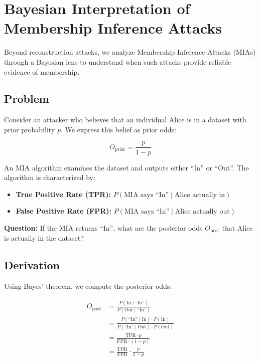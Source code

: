 \documentclass[11pt,letterpaper]{article}
\begin{document}
\section{Bayesian Interpretation of Membership Inference Attacks}

Beyond reconstruction attacks, we analyze Membership Inference Attacks (MIAs) through a Bayesian lens to understand when such attacks provide reliable evidence of membership.

\subsection{Problem}

Consider an attacker who believes that an individual Alice is in a dataset with prior probability $p$. We express this belief as prior odds:

\begin{equation}
    O_{\text{prior}} = \frac{p}{1-p}
\end{equation}

An MIA algorithm examines the dataset and outputs either ``In'' or ``Out''. The algorithm is characterized by:

\begin{itemize}[leftmargin=*]
    \item \textbf{True Positive Rate (TPR):} $P(\text{MIA says ``In''} \mid \text{Alice actually in})$
    \item \textbf{False Positive Rate (FPR):} $P(\text{MIA says ``In''} \mid \text{Alice actually out})$
\end{itemize}

\textbf{Question:} If the MIA returns ``In'', what are the posterior odds $O_{\text{post}}$ that Alice is actually in the dataset?

\subsection{Derivation}

Using Bayes' theorem, we compute the posterior odds:

\begin{align}
    O_{\text{post}} &= \frac{P(\text{In} \mid \text{``In''})}{P(\text{Out} \mid \text{``In''})} \\
    &= \frac{P(\text{``In''} \mid \text{In}) \cdot P(\text{In})}{P(\text{``In''} \mid \text{Out}) \cdot P(\text{Out})} \\
    &= \frac{\text{TPR} \cdot p}{\text{FPR} \cdot (1-p)} \\
    &= \frac{\text{TPR}}{\text{FPR}} \cdot \frac{p}{1-p}
\end{align}
\end{document}
